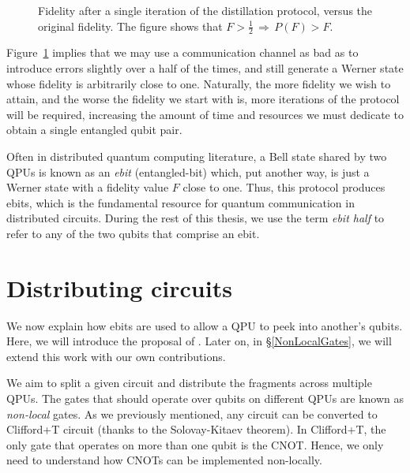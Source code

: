 \begin{figure}
\caption{Fidelity after a single iteration of the distillation protocol, versus the original fidelity. The figure shows that \(F > \frac{1}{2} \, \Rightarrow \, P(F) > F\).}
\label{fig:fidelity}
\centering
{}
\end{figure}

Figure~\ref{fig:fidelity} implies that we may use a communication channel as bad as to introduce errors slightly over a half of the times, and still generate a Werner state whose fidelity is arbitrarily close to one. Naturally, the more fidelity we wish to attain, and the worse the fidelity we start with is, more iterations of the protocol will be required, increasing the amount of time and resources we must dedicate to obtain a single entangled qubit pair.

Often in distributed quantum computing literature, a Bell state shared by two QPUs is known as an \textit{ebit} (entangled-bit) which, put another way, is just a Werner state with a fidelity value \(F\) close to one. Thus, this protocol produces ebits, which is the fundamental resource for quantum communication in distributed circuits. During the rest of this thesis, we use the term \textit{ebit half} to refer to any of the two qubits that comprise an ebit.

\section{Distributing circuits}
\label{IntroDistributing}

We now explain how ebits are used to allow a QPU to peek into another's qubits. Here, we will introduce the proposal of \citet{NonLocalCNOT}. Later on, in \S\ref{NonLocalGates}, we will extend this work with our own contributions. 

We aim to split a given circuit and distribute the fragments across multiple QPUs. The gates that should operate over qubits on different QPUs are known as \textit{non-local} gates. As we previously mentioned, any circuit can be converted to Clifford+T circuit (thanks to the Solovay-Kitaev theorem). In Clifford+T, the only gate that operates on more than one qubit is the CNOT. Hence, we only need to understand how CNOTs can be implemented non-locally.

